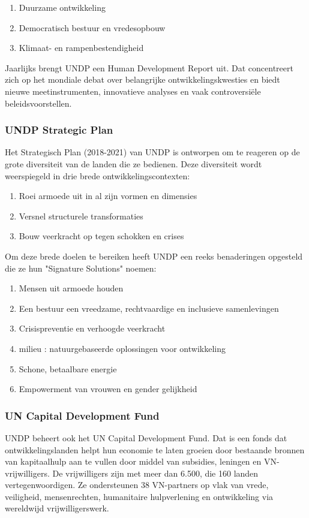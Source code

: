 \begin{enumerate}
\item Duurzame ontwikkeling
\item Democratisch bestuur en vredesopbouw
\item Klimaat- en rampenbestendigheid
\end{enumerate}

 Jaarlijks brengt UNDP een Human Development Report uit. Dat concentreert zich op het mondiale debat over belangrijke ontwikkelingskwesties en biedt nieuwe meetinstrumenten, innovatieve analyses en vaak controversiële beleidsvoorstellen. \autocite{DevelopmentProgram2020} 

\subsubsection{UNDP Strategic Plan}
Het Strategisch Plan (2018-2021) van UNDP is ontworpen om te reageren op de grote diversiteit van de landen die ze bedienen. Deze diversiteit wordt weerspiegeld in drie brede ontwikkelingscontexten: \autocite{DevelopmentProgram2020}

\begin{enumerate}
\item Roei armoede uit in al zijn vormen en dimensies
\item Versnel structurele transformaties
\item Bouw veerkracht op tegen schokken en crises
\end{enumerate}

Om deze brede doelen te bereiken heeft UNDP een reeks benaderingen opgesteld die ze hun "Signature Solutions" noemen:

\begin{enumerate}
	\item Mensen uit armoede houden
	\item Een bestuur een vreedzame, rechtvaardige en inclusieve samenlevingen
	\item Crisispreventie en verhoogde veerkracht
	\item milieu : natuurgebaseerde oplossingen voor ontwikkeling
	\item Schone, betaalbare energie
	\item Empowerment van vrouwen en gender gelijkheid
\end{enumerate}

\subsubsection{UN Capital Development Fund}
UNDP beheert ook het UN Capital Development Fund. Dat is een fonds dat ontwikkelingslanden helpt hun economie te laten groeien door bestaande bronnen van kapitaalhulp aan te vullen door middel van subsidies, leningen en VN-vrijwilligers. De vrijwilligers zijn met meer dan 6.500, die 160 landen vertegenwoordigen. Ze ondersteunen 38 VN-partners op vlak van vrede, veiligheid, mensenrechten, humanitaire hulpverlening en ontwikkeling via wereldwijd vrijwilligerswerk.

